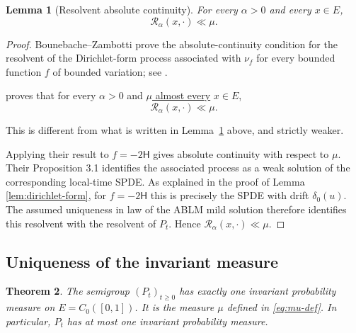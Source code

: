 \documentclass[12pt]{article}
\numberwithin{equation}{section}
\newtheorem{theorem}{Theorem}[section]
\newtheorem{lemma}[theorem]{Lemma}
\newcommand{\1}{\mathbf 1}
\newcommand{\review}[1]{\begin{reviewbox}#1\end{reviewbox}}
\begin{document}
\begin{lemma}[Resolvent absolute continuity]\label{lem:resolvent-ac}
For every $\alpha>0$ and every $x\in E$,
\[
        \mathcal R_\alpha(x,\cdot)\ll \mu.
\]
\end{lemma}
\begin{proof}
Bounebache--Zambotti prove the absolute-continuity condition for the resolvent of
the Dirichlet-form process associated with $\nu_f$ for every bounded function
$f$ of bounded variation; see \cite[Proposition 2.5]{BZ14}.
\review{\cite[Proposition 2.5]{BZ14} proves that for every $\alpha>0$ and \underline{ $\mu$ almost every} $x\in E$,
\[
        \mathcal R_\alpha(x,\cdot)\ll \mu.
\] 

This is different from what is written in Lemma~\ref{lem:resolvent-ac} above, and strictly weaker.}

Applying their result
to $f=-2\mathsf H$ gives absolute continuity with respect to $\mu$. Their
Proposition 3.1 identifies the associated process as a weak solution of the
corresponding local-time SPDE. As explained in the proof of Lemma
\ref{lem:dirichlet-form}, for $f=-2\mathsf H$ this is precisely the SPDE with drift
$\delta_0(u)$. The assumed uniqueness in law of the ABLM mild solution therefore
identifies this resolvent with the resolvent of $P_t$. Hence
$\mathcal R_\alpha(x,\cdot)\ll\mu$.
\end{proof}

\subsection{Uniqueness of the invariant measure}

\begin{theorem}\label{thm:unique-invariant}
The semigroup $(P_t)_{t\geq0}$ has exactly one invariant probability measure on
$E=C_0([0,1])$. It is the measure $\mu$ defined in \eqref{eq:mu-def}. In particular,
$P_t$ has at most one invariant probability measure.
\end{theorem}
\end{document}
